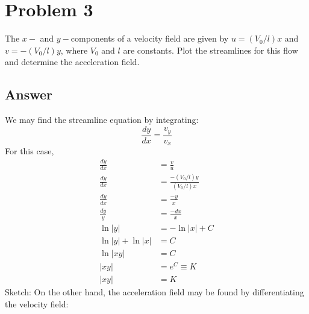 \documentclass{article}
\begin{document}
\newpage

\section*{Problem 3}
The $x-$ and $y-$components of a velocity field are given by $u = (V_0 / l)x$ and $v = -(V_0 / l)y$, where $V_0$ and $l$ are constants. Plot the streamlines for this flow and determine the acceleration field.

\subsection*{Answer}
We may find the streamline equation by integrating:
\begin{equation}
    \frac{dy}{dx} = \frac{v_y}{v_x}
\end{equation}
For this case,
\begin{align*}
    \frac{dy}{dx} &= \frac{v}{u} \\
    \frac{dy}{dx} &= \frac{-(V_0 / l)y}{(V_0 / l)x} \\
    \frac{dy}{dx} &= \frac{-y}{x} \\
    \frac{dy}{y} &= \frac{-dx}{x} \\
    \ln{|y|} &= -\ln{|x|} + C \\
    \ln{|y|} + \ln{|x|} &= C \\
    \ln{|xy|} &= C \\ 
    |xy| &= e^C \equiv K \\
    |xy| &= K
\end{align*}
Sketch:
On the other hand, the acceleration field may be found by differentiating the velocity field:
\end{document}
